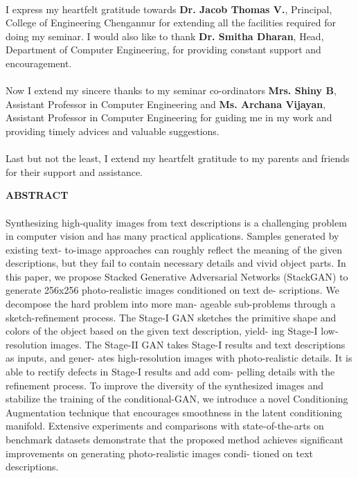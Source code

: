 \documentclass[a4paper,12pt,oneside]{article}
\begin{document}
\paragraph{}
I express my heartfelt gratitude towards \textbf{Dr. Jacob Thomas V.}, Principal, College
of Engineering Chengannur for extending all the facilities required for doing my seminar.
I would also like to thank \textbf{Dr. Smitha Dharan}, Head, Department of Computer
Engineering, for providing constant support and encouragement.
\paragraph{}
Now I extend my sincere thanks to my seminar co-ordinators \textbf{Mrs. Shiny B}, Assistant
Professor in Computer Engineering and \textbf{Ms. Archana Vijayan}, Assistant Professor in Computer Engineering for guiding me in my work and providing timely
advices and valuable suggestions.
\paragraph{}
Last but not the least, I extend my heartfelt gratitude to my parents and friends for
their support and assistance.	

\newpage
\begin{center}
\large{\textbf{ABSTRACT}}
\end{center}
\vspace{4ex}
\paragraph{}
Synthesizing high-quality images from text descriptions is a challenging problem in computer vision and has many practical applications. Samples generated by existing text- to-image approaches can roughly reflect the meaning of the given descriptions, but they fail to contain necessary details and vivid object parts. In this paper, we propose Stacked Generative Adversarial Networks (StackGAN) to generate 256x256 photo-realistic images conditioned on text de- scriptions. We decompose the hard problem into more man- ageable sub-problems through a sketch-refinement process. The Stage-I GAN sketches the primitive shape and colors of the object based on the given text description, yield- ing Stage-I low-resolution images. The Stage-II GAN takes Stage-I results and text descriptions as inputs, and gener- ates high-resolution images with photo-realistic details. It is able to rectify defects in Stage-I results and add com- pelling details with the refinement process. To improve the diversity of the synthesized images and stabilize the training of the conditional-GAN, we introduce a novel Conditioning Augmentation technique that encourages smoothness in the latent conditioning manifold. Extensive experiments and comparisons with state-of-the-arts on benchmark datasets demonstrate that the proposed method achieves significant improvements on generating photo-realistic images condi- tioned on text descriptions.
\end{document}
